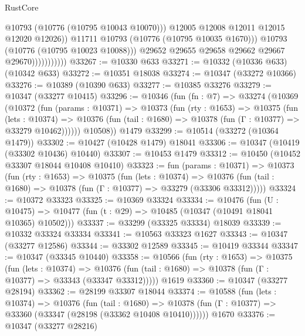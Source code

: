 \begin{lexlean}{RustCore}
\begin{coremodule}
                                    @10793
                                    (@10776 (@10795 @10043 @10070)))
                                  @12005
                                  @12008
                                  @12011
                                  @12015
                                  @12020
                                  @12026))
                              @11711
                              @10793
                              (@10776 (@10795 @10035 @1670)))
                            @10793
                            (@10776 (@10795 @10023 @10088)))
                          @29652
                          @29655
                          @29658
                          @29662
                          @29667
                          @29670)))))))))))
@33267 := @10330 @633
@33271 := @10332 (@10336 @633) (@10342 @633)
@33272 := @10351 @18038
@33274 := @10347 (@33272 @10366)
@33276 := @10389 (@10390 @633)
@33277 := @10385 @33276
@33279 := @10347 (@33277 @10415)
@33296 := @10346
    (fun (fn : @7) =>
    @33274
      (@10369
        (@10372
          (fun (params : @10371) =>
          @10373
            (fun (rty : @1653) =>
            @10375
              (fun (lets : @10374) =>
              @10376 (fun (tail : @1680) => @10378 (fun (Γ : @10377) => @33279 @10462))))))
        @10508))
    @1479
@33299 := @10514 (@33272 (@10364 @1479))
@33302 := @10427 (@10428 @1479) @18041
@33306 := @10347 (@10419 (@33302 @10436) @10440)
@33307 := @10453 @1479
@33312 := @10450 (@10452 @33307 @18044 @10408 @10410)
@33323 := fun (params : @10371) =>
  @10373
    (fun (rty : @1653) =>
    @10375
      (fun (lets : @10374) =>
      @10376 (fun (tail : @1680) => @10378 (fun (Γ : @10377) => @33279 (@33306 @33312)))))
@33324 := @10372 @33323
@33325 := @10369 @33324
@33334 := @10476
    (fun (U : @10475) => @10477 (fun (t : @29) => @10485 (@10347 (@10491 @18041 @10365) @10502)))
@33337 := @33299 (@33325 @33334) @18039
@33339 := @10332 @33324 @33334
@33341 := @10563 @33323 @1627
@33343 := @10347 (@33277 @12586)
@33344 := @33302 @12589
@33345 := @10419 @33344
@33347 := @10347 (@33345 @10440)
@33358 := @10566
    (fun (rty : @1653) =>
    @10375
      (fun (lets : @10374) =>
      @10376 (fun (tail : @1680) => @10378 (fun (Γ : @10377) => @33343 (@33347 @33312)))))
    @1619
@33360 := @10347 (@33277 @28194)
@33362 := @28199 @33307 @18044
@33374 := @10588
    (fun (lets : @10374) =>
    @10376
      (fun (tail : @1680) =>
      @10378 (fun (Γ : @10377) => @33360 (@33347 (@28198 (@33362 @10408 @10410))))))
    @1670
@33376 := @10347 (@33277 @28216)

\end{coremodule}
\end{lexlean}
